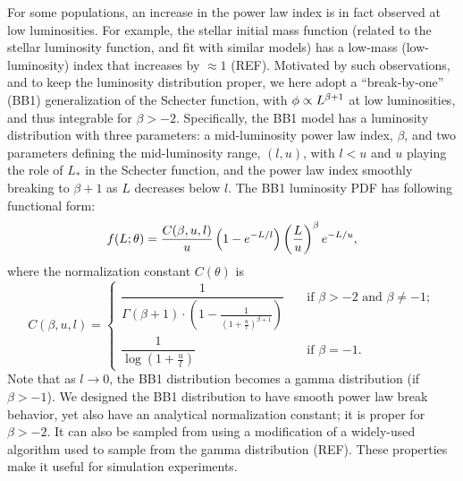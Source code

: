For some populations, an increase in the power law index is in fact observed at low luminosities.
For example, the stellar initial mass function (related to the stellar luminosity function, and fit with similar models) has a low-mass (low-luminosity) index that increases by $\approx 1$ (REF).
Motivated by such observations, and to keep the luminosity distribution proper, we here adopt a ``break-by-one'' (BB1) generalization of the Schecter function, with $\phi \propto L^{\beta+1}$ at low luminosities, and thus integrable for $\beta > -2$.
Specifically, the BB1 model has a luminosity distribution with three parameters: a mid-luminosity power law index, $\beta$, and two parameters defining the mid-luminosity range, $(l, u)$, with $l < u$ and  $u$ playing the role of $L_*$ in the Schecter function, and the power law index smoothly breaking to $\beta+1$ as $L$ decreases below $l$.
The BB1 luminosity PDF has following functional form:
\begin{equation}
\label{eq:lumPDF} 
f(L ; \theta) = 
  \frac{C(\beta,u,l)}{u}\left(1-e^{-L/l}\right) \left(\frac{L}{u}\right)^{\beta} e^{-L/u},
\end{equation}
where the normalization constant $C(\theta)$ is
\begin{equation}
\label{eq:normLumPDF} 
C(\beta,u,l) =
  \begin{cases} \dfrac{1}{\Gamma(\beta+1)\cdot\left(1-\frac{1}{\left(1+\frac{u}{l}\right)^{\beta+1}}\right)} 
    & \quad \text{if } \beta > -2\text{ and }\beta \ne -1; \\
 \dfrac{1}{\log\left(1+\frac{u}{l}\right)} & \quad \text{if } \beta=-1.
  \end{cases}
\end{equation} 
Note that as $l\rightarrow 0$, the BB1 distribution becomes a gamma distribution (if $\beta > -1$).
We designed the BB1 distribution to have smooth power law break behavior, yet also have an analytical normalization constant;
it is proper for $\beta > -2$.
It can also be sampled from using a modification of a widely-used algorithm used to sample from the gamma distribution (REF).
These properties make it useful for simulation experiments.


